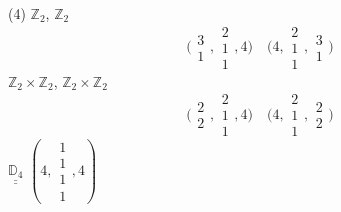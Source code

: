 \documentclass[11pt,a4paper]{article}
\begin{document}
(4)
 \quad $\mathbb{Z}_2$, $\mathbb{Z}_2$
\[
  \bigl(\begin{smallmatrix}3\\1\end{smallmatrix}, \begin{smallmatrix}2\\1\\1\end{smallmatrix}, 4\bigr) \quad
  \bigl(4, \begin{smallmatrix}2\\1\\1\end{smallmatrix}, \begin{smallmatrix}3\\1\end{smallmatrix}\bigr)
\]
 \quad $\mathbb{Z}_2 \times \mathbb{Z}_2$, $\mathbb{Z}_2 \times \mathbb{Z}_2$
\[
  \bigl(\begin{smallmatrix}2\\2\end{smallmatrix}, \begin{smallmatrix}2\\1\\1\end{smallmatrix}, 4\bigr) \quad
  \bigl(4, \begin{smallmatrix}2\\1\\1\end{smallmatrix}, \begin{smallmatrix}2\\2\end{smallmatrix}\bigr)
\]
 \quad $\underline{\underline{\mathbb{D}_4}}$ \quad $(4, \begin{smallmatrix}1\\1\\1\\1\end{smallmatrix}, 4)$
\end{document}
